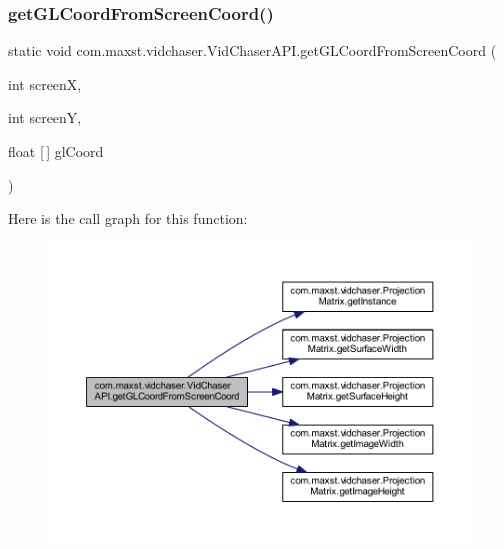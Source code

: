 \subsubsection{\texorpdfstring{get\+G\+L\+Coord\+From\+Screen\+Coord()}{getGLCoordFromScreenCoord()}}
{\footnotesize\ttfamily static void com.\+maxst.\+vidchaser.\+Vid\+Chaser\+A\+P\+I.\+get\+G\+L\+Coord\+From\+Screen\+Coord (\begin{DoxyParamCaption}\item[{int}]{screenX,  }\item[{int}]{screenY,  }\item[{float \mbox{[}$\,$\mbox{]}}]{gl\+Coord }\end{DoxyParamCaption})\hspace{0.3cm}{\ttfamily [static]}}

Here is the call graph for this function\+:\nopagebreak
\begin{figure}[H]
\begin{center}
\leavevmode
\includegraphics[width=350pt]{classcom_1_1maxst_1_1vidchaser_1_1_vid_chaser_a_p_i_a023777164b60f04666b2e5b718580e03_cgraph}
\end{center}
\end{figure}
\mbox{\label{classcom_1_1maxst_1_1vidchaser_1_1_vid_chaser_a_p_i_ad862cc3057d072216e0f3a7b4e9e295b}} 
